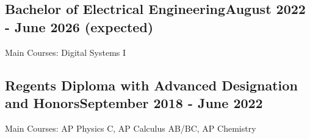 \vspace*{10pt}


\subsection{{Bachelor of Electrical Engineering}\hfill August 2022 - June 2026 (expected)}
\vspace*{5pt}
Main Courses: Digital Systems I

\vspace*{6pt}

\subsection{{Regents Diploma with Advanced Designation and Honors}\hfill September 2018 - June 2022}
\vspace*{5pt}
Main Courses: AP Physics C, AP Calculus AB/BC, AP Chemistry